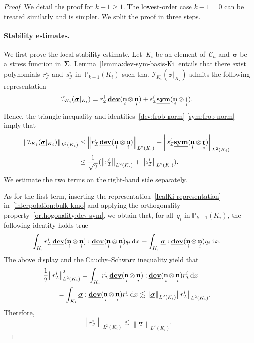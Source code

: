 \documentclass[a4paper,twoside,10pt]{article}
\theoremstyle{plain}
\theoremstyle{remark}
\theoremstyle{definition}
\numberwithin{equation}{section}
\numberwithin{figure}{section}
\newcommand{\Norm}[1]{{\left\|{#1} \right\|}}
\newcommand{\Pbbkmo}{\mathbb{P}_{k-1}}
\newcommand{\Ccalh}{\mathcal{C}_h}
\newcommand{\K}{K}
\newcommand{\sigmabf}{\underline{\boldsymbol{\sigma}}}
\DeclareMathOperator{\dev}{\underline{\mathbf{dev}}}
\newcommand{\sym}{\underline{\bf{sym}}}
\DeclareMathOperator{\norm}{\bf{n}}
\DeclareMathOperator{\tang}{\bf{t}}
\newcommand{\Ltwo}{L^2}
\newcommand{\dx}{\, \mathrm{d}x}
\newcommand{\Ki}{{\K_i}}
\newcommand{\normi}{\norm_i}
\newcommand{\tangi}{\tang_i}
\newcommand{\IcalKi}{\mathcal{I}_{\Ki}}
\newcommand{\Sigmabf}{\underline{\boldsymbol{\Sigma}}}
\newcommand{\sIi}{s_{\mathcal{I}}^i}
\newcommand{\rIi}{r_{\mathcal{I}}^i}
\newcommand{\qi}{q_{i}}
\begin{document}
\begin{proof}
We detail the proof for $k-1 \geq 1$.
The lowest-order case $k-1 = 0$ can be treated similarly
and is simpler.
We split the proof in three steps.
\paragraph*{Stability estimates.}
We first prove the local stability estimate.
Let~$\Ki$ be an element of~$\Ccalh$
and~$\sigmabf$ be a stress function in~$\Sigmabf$.
Lemma~\ref{lemma:dev-sym-basis-Ki} entails that
there exist polynomials~$\rIi$ and~$\sIi$ in~$\Pbbkmo(\Ki)$
such that
$\IcalKi(\sigmabf|_{\Ki})$ admits the following representation
\begin{equation} \label{IcalKi-representation}
\IcalKi(\sigmabf|_{\Ki}) = \rIi\dev(\normi\otimes\normi) + \sIi\sym(\normi\otimes\tangi).
\end{equation}
Hence,
the triangle inequality
and identities~\eqref{dev:frob-norm}-\eqref{sym:frob-norm}
imply that
\begin{equation} \label{triangle-IcalKi}
\begin{split}
\Norm{\IcalKi(\sigmabf|_{\Ki})}_{\Ltwo(\Ki)}
&\leq \Norm{\rIi\dev(\normi\otimes\normi)}_{\Ltwo(\Ki)}
    + \Norm{\sIi\sym(\normi\otimes\tangi)}_{\Ltwo(\Ki)} \\
&\leq\frac{1}{\sqrt{2}}
    (\Norm{\rIi}_{\Ltwo(\Ki)}
    +\Norm{\sIi}_{\Ltwo(\Ki)}).
\end{split}
\end{equation}
We estimate the two terms on the right-hand side separately.

As for the first term,
inserting the representation~\eqref{IcalKi-representation}
in~\eqref{interpolation:bulk-kmo}
and applying the orthogonality property~\eqref{orthogonality:dev-sym},
we obtain that,
for all~$\qi$ in $\Pbbkmo(\Ki)$,
the following identity holds true
\begin{equation*} \label{rIi-integral-value}
\int_{\Ki} \rIi \dev(\normi\otimes\normi) : \dev(\normi\otimes\normi) \qi \dx
= \int_{\Ki} \sigmabf : \dev(\normi\otimes\normi) \qi \dx.
\end{equation*}
The above display
and the Cauchy--Schwarz inequality
yield that
\begin{equation*} 
\begin{split}
&\frac12\Norm{\rIi}_{\Ltwo(\Ki)}^2
= \int_{\Ki}\rIi\dev(\normi\otimes\normi):\dev(\normi\otimes\normi)\rIi\dx \\
&\qquad= \int_{\Ki} \sigmabf:\dev(\normi\otimes\normi)\rIi \dx 
\lesssim \Norm{\sigmabf}_{\Ltwo(\Ki)} \Norm{\rIi}_{\Ltwo(\Ki)}.
\end{split}
\end{equation*}
Therefore,
\begin{equation} \label{rIi-estimate}
\Norm{\rIi}_{\Ltwo(\Ki)} \lesssim \Norm{\sigmabf}_{\Ltwo(\Ki)}.
\end{equation}


\end{proof}
\end{document}
